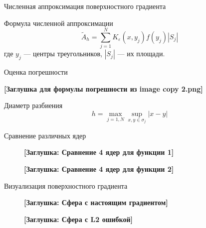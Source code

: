\documentclass[aspectratio=169,xcolor=dvipsnames]{beamer}
\begin{document}
\begin{frame}{Численная аппроксимация поверхностного градиента}
    \begin{block}{Формула численной аппроксимации}
        \[\tilde{A}_h = \sum_{j=1}^N K_\varepsilon(x, y_j) f(y_j) |S_j|\]
        где $y_j$ — центры треугольников, $|S_j|$ — их площади.
    \end{block}
    
    \begin{block}{Оценка погрешности}
        \begin{center}
            \textbf{[Заглушка для формулы погрешности из image copy 2.png]}
        \end{center}
    \end{block}
    
    \begin{block}{Диаметр разбиения}
        \[h = \max_{j=1,N} \sup_{x,y \in \sigma_j} |x - y|\]
    \end{block}
\end{frame}

\begin{frame}{Сравнение различных ядер}
    \begin{figure}
        \centering
        \begin{minipage}{0.45\textwidth}
            \centering
            \textbf{[Заглушка: Сравнение 4 ядер для функции 1]}
            \vspace{3cm}
        \end{minipage}
        \hfill
        \begin{minipage}{0.45\textwidth}
            \centering
            \textbf{[Заглушка: Сравнение 4 ядер для функции 2]}
            \vspace{3cm}
        \end{minipage}
    \end{figure}
\end{frame}

\begin{frame}{Визуализация поверхностного градиента}
    \begin{figure}
        \centering
        \begin{minipage}{0.45\textwidth}
            \centering
            \textbf{[Заглушка: Сфера с настоящим градиентом]}
            \vspace{4cm}
        \end{minipage}
        \hfill
        \begin{minipage}{0.45\textwidth}
            \centering
            \textbf{[Заглушка: Сфера с L2 ошибкой]}
            \vspace{4cm}
        \end{minipage}
    \end{figure}
\end{frame}
\end{document}
